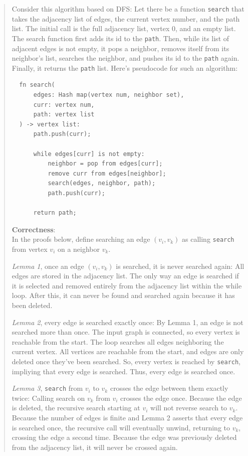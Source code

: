 \documentclass[11pt]{article}
\begin{document}
\begin{enumerate}
\begin{enumerate}
\begin{quote}
      \medskip
      Consider this algorithm based on DFS: Let there be a function \texttt{search} that takes the adjacency list of edges, the current vertex number, and the path list. The initial call is the full adjacency list, vertex 0, and an empty list. The search function first adds its id to the \texttt{path}. Then, while its list of adjacent edges is not empty, it pops a neighbor, removes itself from its neighbor's list, searches the neighbor, and pushes its id to the \texttt{path} again. Finally, it returns the \texttt{path} list. Here's pseudocode for such an algorithm: 

  \begin{verbatim}
  fn search(
      edges: Hash map(vertex num, neighbor set), 
      curr: vertex num, 
      path: vertex list
  ) -> vertex list:
      path.push(curr);

      while edges[curr] is not empty:
          neighbor = pop from edges[curr];
          remove curr from edges[neighbor];
          search(edges, neighbor, path);
          path.push(curr);

      return path;
  \end{verbatim}

  \textbf{Correctness}: \\
  In the proofs below, define searching an edge $(v_i, v_k)$ as calling \texttt{search} from vertex $v_i$ on a neighbor $v_k$.

  \medskip
  \textit{Lemma 1}, once an edge $(v_i, v_k)$ is searched, it is never searched again: All edges are stored in the adjacency list. The only way an edge is searched if it is selected and removed entirely from the adjacency list within the while loop. After this, it can never be found and searched again because it has been deleted.

  \medskip
  \textit{Lemma 2}, every edge is searched exactly once: By Lemma 1, an edge is not searched more than once. The input graph is connected, so every vertex is reachable from the start. The loop searches all edges neighboring the current vertex. All vertices are reachable from the start, and edges are only deleted once they've been searched. So, every vertex is reached by \texttt{search}, impliying that every edge is searched. Thus, every edge is searched once.

  \medskip
  \textit{Lemma 3}, \texttt{search} from $v_i$ to $v_k$ crosses the edge between them exactly twice: Calling search on $v_k$ from $v_i$ crosses the edge once. Because the edge is deleted, the recursive search starting at $v_i$ will not reverse search to $v_k$. Because the number of edges is finite and Lemma 2 asserts that every edge is searched once, the recursive call will eventually unwind, returning to $v_k$, crossing the edge a second time. Because the edge was previously deleted from the adjacency list, it will never be crossed again. 
      

\end{quote}
\end{enumerate}
\end{enumerate}
\end{document}
